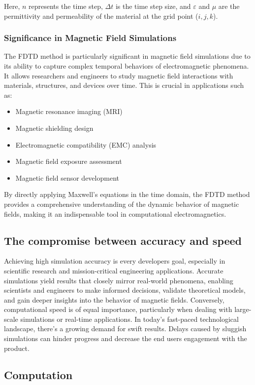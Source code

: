 Here, \(n\) represents the time step, \(\Delta t\) is the time step size, and \(\varepsilon\) and \(\mu\) are the permittivity and permeability of the material at the grid point (\(i, j, k\)).
\newpage
\subsubsection{Significance in Magnetic Field Simulations}
The FDTD method is particularly significant in magnetic field simulations due to its ability to capture complex temporal behaviors of electromagnetic phenomena. It allows researchers and engineers to study magnetic field interactions with materials, structures, and devices over time. This is crucial in applications such as:
\begin{itemize}
	\item Magnetic resonance imaging (MRI)
	\item Magnetic shielding design
	\item Electromagnetic compatibility (EMC) analysis
	\item Magnetic field exposure assessment
	\item Magnetic field sensor development
\end{itemize}
By directly applying Maxwell's equations in the time domain, the FDTD method provides a comprehensive understanding of the dynamic behavior of magnetic fields, making it an indispensable tool in computational electromagnetics. 
\subsection{The compromise between accuracy and speed}
Achieving high simulation accuracy is every developers goal, especially in scientific research and mission-critical engineering applications. Accurate simulations yield results that closely mirror real-world phenomena, enabling scientists and engineers to make informed decisions, validate theoretical models, and gain deeper insights into the behavior of magnetic fields. 
Conversely, computational speed is of equal importance, particularly when dealing with large-scale simulations or real-time applications. In today's fast-paced technological landscape, there's a growing demand for swift results. Delays caused by sluggish simulations can hinder progress and decrease the end users engagement with the product. 

\newpage

\subsection{Computation}
